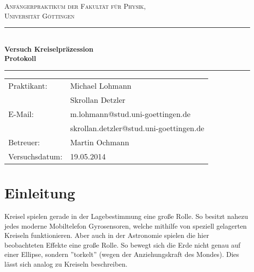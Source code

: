 \documentclass[12pt,a4paper,titlepage,headinclude,bibtotoc]{scrartcl}
\begin{document}
\begin{titlepage}
\centering
\textsc{\Large Anfängerpraktikum der Fakultät für
  Physik,\\[1.5ex] Universität Göttingen}

\vspace*{4.2cm}

\rule{\textwidth}{1pt}\\[0.5cm]
{\huge \bfseries
  Versuch Kreiselpräzession\\[1.5ex]
  Protokoll}\\[0.5cm]
\rule{\textwidth}{1pt}

\vspace*{3cm}

\begin{Large}
\begin{tabular}{ll}
Praktikant: &  Michael Lohmann\\
 &  Skrollan Detzler\\
 E-Mail: & m.lohmann@stud.uni-goettingen.de\\
 &  skrollan.detzler@stud.uni-goettingen.de\\
 Betreuer: & Martin Ochmann\\
 Versuchsdatum: & 19.05.2014\\
\end{tabular}
\end{Large}

\vspace*{0.8cm}

\begin{Large}
\end{Large}

\end{titlepage}

\tableofcontents

\newpage

\section{Einleitung}
\label{sec:einleitung}
Kreisel spielen gerade in der Lagebestimmung eine große Rolle.
So besitzt nahezu jedes moderne Mobiltelefon Gyrosensoren, welche mithilfe von speziell gelagerten Kreiseln funktionieren.
Aber auch in der Astronomie spielen die hier beobachteten Effekte eine große Rolle.
So bewegt sich die Erde nicht genau auf einer Ellipse, sondern ''torkelt'' (wegen der Anziehungskraft des Mondes).
Dies lässt sich analog zu Kreiseln beschreiben.
\end{document}
